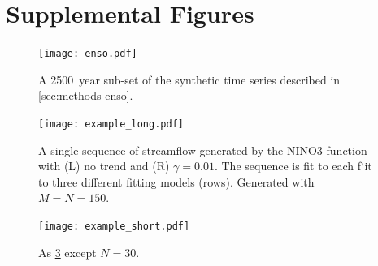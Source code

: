 \documentclass[12pt]{article}
\begin{document}
\section{Supplemental Figures}

\begin{figure}
  \texttt{[image: enso.pdf]}
  \caption{
    A \SI{2500}{year} sub-set of the synthetic time series described in \cref{sec:methods-enso}.\label{fig:enso-ts}
  }
\end{figure}

\begin{figure}
  \texttt{[image: example\_long.pdf]}
  \caption{
    A single sequence of streamflow generated by the NINO3 function with (L) no trend and (R) \(\gamma=0.01\). 
    The sequence is fit to each f`it to three different fitting models (rows). 
    Generated with \(M=N=150\).\label{fig:example-long}
  }
\end{figure}

\begin{figure}
  \texttt{[image: example\_short.pdf]}
  \caption{
    As \cref{fig:example-short} except \(N=30\).\label{fig:example-short}
  }
\end{figure}
\end{document}
